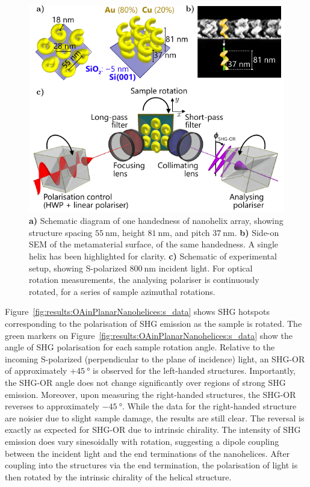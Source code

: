 \begin{figure}[htb!]	
    \centering	
    \includegraphics[scale=1.0]{./figures/results/OAinPlanarNanohelices/setup.pdf}
    \caption{\label{fig:results:OAinPlanarNanohelices:setup}
    \textbf{a)} Schematic diagram of one handedness of nanohelix array, showing structure spacing $\SI{55}{\nano\m}$, height $\SI{81}{\nano\m}$, and pitch $\SI{37}{\nano\m}$. \textbf{b)} Side-on SEM of the metamaterial surface, of the same handedness. A single helix has been highlighted for clarity. \textbf{c)} Schematic of experimental setup, showing S-polarized $\SI{800}{\nano\m}$ incident light. For optical rotation measurements, the analysing polariser is continuously rotated, for a series of sample azimuthal rotations.}	
\end{figure}

Figure~\ref{fig:results:OAinPlanarNanohelices:s_data} shows SHG hotspots corresponding to the polarisation of SHG emission as the sample is rotated. The green markers on Figure~\ref{fig:results:OAinPlanarNanohelices:s_data} show the angle of SHG polarisation for each sample rotation angle. Relative to the incoming S-polarized (perpendicular to the plane of incidence) light, an SHG-OR of approximately $+\SI{45}{\degree}$ is observed for the left-handed structures. Importantly, the SHG-OR angle does not change significantly over regions of strong SHG emission.
Moreover, upon measuring the right-handed structures, the SHG-OR reverses to approximately $-\SI{45}{\degree}$. While the data for the right-handed structure are noisier due to slight sample damage, the results are still clear. The reversal is exactly as expected for SHG-OR due to intrinsic chirality. The intensity of SHG emission does vary sinesoidally with rotation, suggesting a dipole coupling between the incident light and the end terminations of the nanohelices. After coupling into the structures via the end termination, the polarisation of light is then rotated by the intrinsic chirality of the helical structure.


